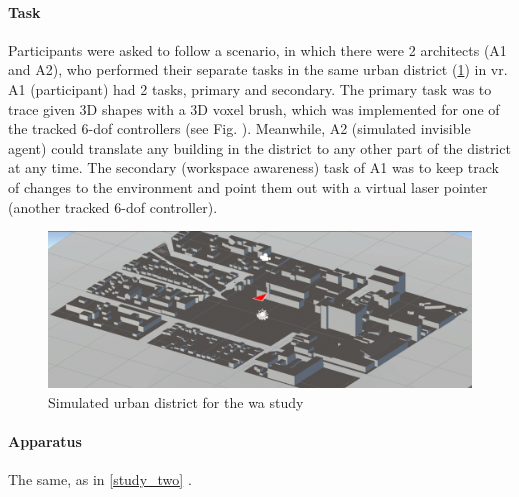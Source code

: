 \paragraph{Task}
Participants were asked to follow a scenario, in which there were 2 architects (A1 and A2), who performed their separate tasks in the same urban district (\ref{fig:urbandistrict}) in \gls{vr}. A1 (participant) had 2 tasks, primary and secondary. The primary task was to trace given 3D shapes with a 3D voxel brush, which was implemented for one of the tracked 6-\gls{dof} controllers (see Fig. ). Meanwhile, A2 (simulated invisible agent) could translate any building in the district to any other part of the district at any time. The secondary (workspace awareness) task of A1 was to keep track of changes to the environment and point them out with a virtual laser pointer (another tracked 6-\gls{dof} controller).

\begin{figure}
	\centering
	\includegraphics[width=0.7\linewidth]{figures/urban_district}
	\caption{Simulated urban district for the \gls{wa} study}
	\label{fig:urbandistrict}
\end{figure}


\paragraph{Apparatus} The same, as in \ref{study_two} .

